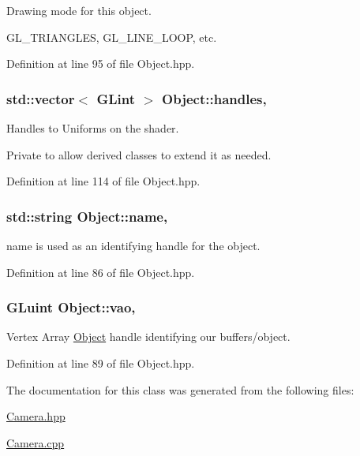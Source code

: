 Drawing mode for this object. 

G\-L\-\_\-\-T\-R\-I\-A\-N\-G\-L\-E\-S, G\-L\-\_\-\-L\-I\-N\-E\-\_\-\-L\-O\-O\-P, etc. 

Definition at line 95 of file Object.\-hpp.

\hypertarget{class_object_acd6c7021617ea334915a1525f9519bc5}{
\subsubsection[{handles}]{\setlength{\rightskip}{0pt plus 5cm}std\-::vector$<$ G\-Lint $>$ Object\-::handles\hspace{0.3cm}{\ttfamily [protected]}, {\ttfamily [inherited]}}}\label{class_object_acd6c7021617ea334915a1525f9519bc5}


Handles to Uniforms on the shader. 

Private to allow derived classes to extend it as needed. 

Definition at line 114 of file Object.\-hpp.

\hypertarget{class_object_a24457e0a387492c80594aec7681a2277}{
\subsubsection[{name}]{\setlength{\rightskip}{0pt plus 5cm}std\-::string Object\-::name\hspace{0.3cm}{\ttfamily [protected]}, {\ttfamily [inherited]}}}\label{class_object_a24457e0a387492c80594aec7681a2277}


name is used as an identifying handle for the object. 



Definition at line 86 of file Object.\-hpp.

\hypertarget{class_object_a66190fee29d03d6478516686cbd01eb8}{
\subsubsection[{vao}]{\setlength{\rightskip}{0pt plus 5cm}G\-Luint Object\-::vao\hspace{0.3cm}{\ttfamily [protected]}, {\ttfamily [inherited]}}}\label{class_object_a66190fee29d03d6478516686cbd01eb8}


Vertex Array \hyperlink{class_object}{Object} handle identifying our buffers/object. 



Definition at line 89 of file Object.\-hpp.



The documentation for this class was generated from the following files\-:\begin{DoxyCompactItemize}
\item 
\hyperlink{_camera_8hpp}{Camera.\-hpp}\item 
\hyperlink{_camera_8cpp}{Camera.\-cpp}\end{DoxyCompactItemize}
